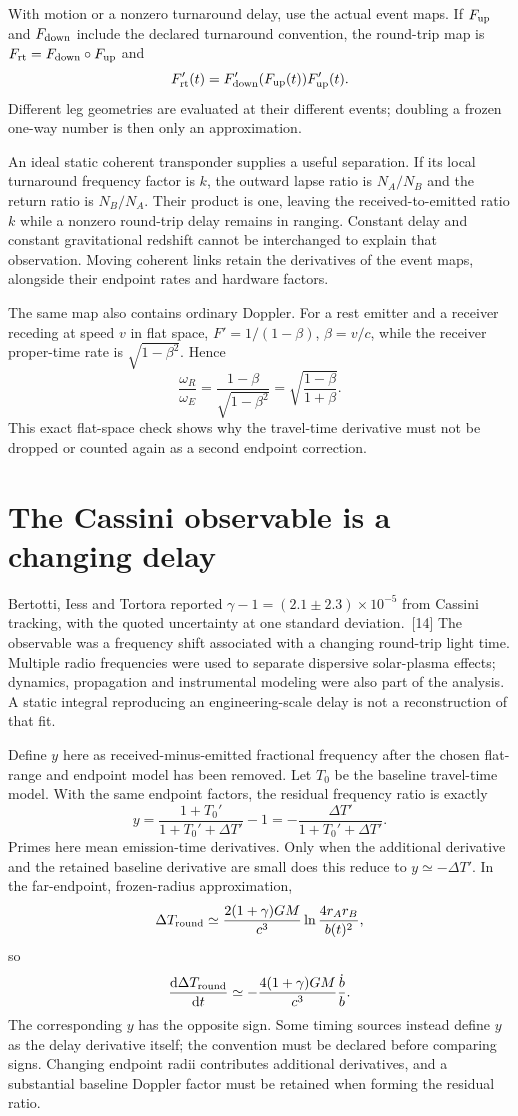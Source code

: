 \documentclass[10pt,twocolumn,letterpaper]{article}
\newcommand{\dd}{\mathrm{d}}
\begin{document}
With motion or a nonzero turnaround delay, use the actual event maps. If $F_{\rm up}$ and $F_{\rm down}$ include the declared turnaround convention, the round-trip map is $F_{\rm rt}=F_{\rm down}\circ F_{\rm up}$ and
\[
 F'_{\rm rt}(t)=F'_{\rm down}(F_{\rm up}(t))F'_{\rm up}(t).
\]
Different leg geometries are evaluated at their different events; doubling a frozen one-way number is then only an approximation.

An ideal static coherent transponder supplies a useful separation. If its local turnaround frequency factor is $k$, the outward lapse ratio is $N_A/N_B$ and the return ratio is $N_B/N_A$. Their product is one, leaving the received-to-emitted ratio $k$ while a nonzero round-trip delay remains in ranging. Constant delay and constant gravitational redshift cannot be interchanged to explain that observation. Moving coherent links retain the derivatives of the event maps, alongside their endpoint rates and hardware factors.

The same map also contains ordinary Doppler. For a rest emitter and a receiver receding at speed $v$ in flat space, $F'=1/(1-\beta)$, $\beta=v/c$, while the receiver proper-time rate is $\sqrt{1-\beta^2}$. Hence
\[
 \frac{\omega_R}{\omega_E}
 =\frac{1-\beta}{\sqrt{1-\beta^2}}
 =\sqrt{\frac{1-\beta}{1+\beta}}.
\]
This exact flat-space check shows why the travel-time derivative must not be dropped or counted again as a second endpoint correction.


\section{The Cassini observable is a changing delay}
Bertotti, Iess and Tortora reported $\gamma-1=(2.1\pm 2.3)\times 10^{-5}$ from Cassini tracking, with the quoted uncertainty at one standard deviation.~[14] The observable was a frequency shift associated with a changing round-trip light time. Multiple radio frequencies were used to separate dispersive solar-plasma effects; dynamics, propagation and instrumental modeling were also part of the analysis. A static integral reproducing an engineering-scale delay is not a reconstruction of that fit.

Define $y$ here as received-minus-emitted fractional frequency after the chosen flat-range and endpoint model has been removed. Let $T_0$ be the baseline travel-time model. With the same endpoint factors, the residual frequency ratio is exactly
\[
 y=\frac{1+T_0'}{1+T_0'+\Delta T'}-1
   =-\frac{\Delta T'}{1+T_0'+\Delta T'}.
\]
Primes here mean emission-time derivatives. Only when the additional derivative and the retained baseline derivative are small does this reduce to $y\simeq-\Delta T'$. In the far-endpoint, frozen-radius approximation,
\[
 \Delta T_{\rm round}\simeq
 \frac{2(1+\gamma)GM}{c^3}\ln\frac{4r_Ar_B}{b(t)^2},
\]
so
\[
 \frac{\dd\Delta T_{\rm round}}{\dd t}
 \simeq-\frac{4(1+\gamma)GM}{c^3}\frac{\dot b}{b}.
\]
The corresponding $y$ has the opposite sign. Some timing sources instead define $y$ as the delay derivative itself; the convention must be declared before comparing signs. Changing endpoint radii contributes additional derivatives, and a substantial baseline Doppler factor must be retained when forming the residual ratio.
\end{document}
